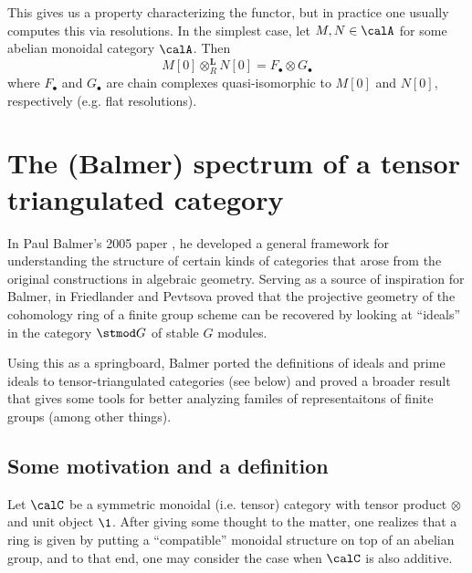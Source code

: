 \documentclass[12pt]{article}
\begin{document}
This gives us a property characterizing the functor, but in practice one usually computes this via resolutions. In the simplest case, let $M,N\in\calA$ for some abelian monoidal category $\calA$. Then 
\[M[0]\otimes^\mathbf{L}_R N[0]=F_\bullet\otimes G_\bullet\]
where $F_\bullet$ and $G_\bullet$ are chain complexes quasi-isomorphic to $M[0]$ and $N[0]$, respectively (e.g. flat resolutions).


\newpage
\section{The (Balmer) spectrum of a tensor triangulated category}\label{sec:ttc}
In Paul Balmer's 2005 paper \cite{balmer-spc}, he developed a general framework for understanding the structure of certain 
kinds of categories that arose from the original constructions in algebraic geometry. Serving as a source of inspiration for Balmer, in \cite{friedlander-pevtsova-pi} Friedlander and Pevtsova proved
that the projective geometry of the cohomology ring of a finite group scheme can be recovered by looking at ``ideals'' in the category $\stmod G$ 
of stable $G$ modules.

Using this as a springboard, Balmer ported the definitions of ideals and prime ideals to tensor-triangulated categories (see below)
and proved a broader result that gives some tools for better analyzing familes of representaitons of finite groups (among other things).
\subsection{Some motivation and a definition}
Let $\calC$ be a symmetric monoidal (i.e. tensor) category with tensor product $\otimes$ and unit object $\1$. After giving some 
thought to the matter, one realizes that a ring is given by putting a ``compatible'' monoidal structure on top of an abelian group,
and to that end, one may consider the case when $\calC$ is also additive. 
\end{document}
